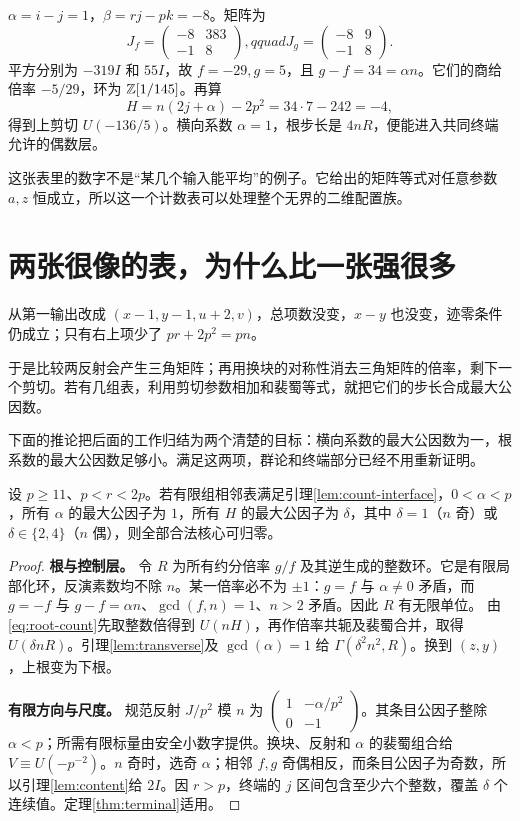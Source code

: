 $\alpha=i-j=1$，$\beta=rj-pk=-8$。矩阵为
\[
J_f=\begin{pmatrix}-8&383\\-1&8\end{pmatrix},qquad
J_g=\begin{pmatrix}-8&9\\-1&8\end{pmatrix}.
\]
平方分别为 $-319I$ 和 $55I$，故 $f=-29,g=5$，且 $g-f=34=\alpha n$。它们的商给倍率 $-5/29$，环为 $\mathbb Z[1/145]$。再算
\[H=n(2j+\alpha)-2p^2=34\cdot7-242=-4,
\]
得到上剪切 $U(-136/5)$。横向系数 $\alpha=1$，根步长是 $4nR$，便能进入共同终端允许的偶数层。

这张表里的数字不是“某几个输入能平均”的例子。它给出的矩阵等式对任意参数 $a,z$ 恒成立，所以这一个计数表可以处理整个无界的二维配置族。

\section{两张很像的表，为什么比一张强很多}
从第一输出改成 $(x-1,y-1,u+2,v)$，总项数没变，$x-y$ 也没变，迹零条件仍成立；只有右上项少了 $pr+2p^2=pn$。

于是比较两反射会产生三角矩阵；再用换块的对称性消去三角矩阵的倍率，剩下一个剪切。若有几组表，利用剪切参数相加和裴蜀等式，就把它们的步长合成最大公因数。

下面的推论把后面的工作归结为两个清楚的目标：横向系数的最大公因数为一，根系数的最大公因数足够小。满足这两项，群论和终端部分已经不用重新证明。
\begin{corollary}[相邻输出表的充分条件]\label{cor:resource}
设 $p\ge11$、$p<r<2p$。若有限组相邻表满足引理\ref{lem:count-interface}，$0<\alpha<p$，所有 $\alpha$ 的最大公因子为 $1$，所有 $H$ 的最大公因子为 $\delta$，其中 $\delta=1$（$n$ 奇）或 $\delta\in\{2,4\}$（$n$ 偶），则全部合法核心可归零。
\end{corollary}
\begin{proof}

\par\noindent\textbf{根与控制层。}
令 $R$ 为所有约分倍率 $g/f$ 及其逆生成的整数环。它是有限局部化环，反演素数均不除 $n$。某一倍率必不为 $\pm1$：$g=f$ 与 $\alpha\ne0$ 矛盾，而 $g=-f$ 与 $g-f=\alpha n$、$\gcd(f,n)=1$、$n>2$ 矛盾。因此 $R$ 有无限单位。
由\eqref{eq:root-count}先取整数倍得到 $U(nH)$，再作倍率共轭及裴蜀合并，取得 $U(\delta nR)$。引理\ref{lem:transverse}及 $\gcd(\alpha)=1$ 给 $\Gamma(\delta^2n^2,R)$。换到 $(z,y)$，上根变为下根。

\par\noindent\textbf{有限方向与尺度。}
规范反射 $J/p^2$ 模 $n$ 为 $\left(\begin{smallmatrix}1&-\alpha/p^2\\0&-1\end{smallmatrix}\right)$。其条目公因子整除 $\alpha<p$；所需有限标量由安全小数字提供。换块、反射和 $\alpha$ 的裴蜀组合给 $V\equiv U(-p^{-2})$。$n$ 奇时，选奇 $\alpha$；相邻 $f,g$ 奇偶相反，而条目公因子为奇数，所以引理\ref{lem:content}给 $2I$。因 $r>p$，终端的 $j$ 区间包含至少六个整数，覆盖 $\delta$ 个连续值。定理\ref{thm:terminal}适用。
\end{proof}
